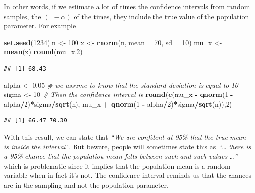 \documentclass[
]{article}
\newenvironment{Shaded}{\begin{snugshade}}{\end{snugshade}}
\newcommand{\AttributeTok}[1]{\textcolor[rgb]{0.13,0.29,0.53}{#1}}
\newcommand{\CommentTok}[1]{\textcolor[rgb]{0.56,0.35,0.01}{\textit{#1}}}
\newcommand{\DecValTok}[1]{\textcolor[rgb]{0.00,0.00,0.81}{#1}}
\newcommand{\FloatTok}[1]{\textcolor[rgb]{0.00,0.00,0.81}{#1}}
\newcommand{\FunctionTok}[1]{\textcolor[rgb]{0.13,0.29,0.53}{\textbf{#1}}}
\newcommand{\NormalTok}[1]{#1}
\newcommand{\OtherTok}[1]{\textcolor[rgb]{0.56,0.35,0.01}{#1}}
\newcommand{\SpecialCharTok}[1]{\textcolor[rgb]{0.81,0.36,0.00}{\textbf{#1}}}
\begin{document}
In other words, if we estimate a lot of times the confidence intervals
from random samples, the \((1- \alpha)%
\) of the times, they include the true value of the population
parameter. For example

\begin{Shaded}
\begin{Highlighting}[]
\FunctionTok{set.seed}\NormalTok{(}\DecValTok{1234}\NormalTok{)}
\NormalTok{n }\OtherTok{\textless{}{-}} \DecValTok{100}
\NormalTok{x }\OtherTok{\textless{}{-}} \FunctionTok{rnorm}\NormalTok{(n, }\AttributeTok{mean =} \DecValTok{70}\NormalTok{, }\AttributeTok{sd =} \DecValTok{10}\NormalTok{)}
\NormalTok{mu\_x }\OtherTok{\textless{}{-}} \FunctionTok{mean}\NormalTok{(x)}
\FunctionTok{round}\NormalTok{(mu\_x,}\DecValTok{2}\NormalTok{)}
\end{Highlighting}
\end{Shaded}

\begin{verbatim}
## [1] 68.43
\end{verbatim}

\begin{Shaded}
\begin{Highlighting}[]
\NormalTok{alpha }\OtherTok{\textless{}{-}} \FloatTok{0.05}
\CommentTok{\# we assume to know that the standard deviation is equal to 10}
\NormalTok{sigma }\OtherTok{\textless{}{-}} \DecValTok{10}
\CommentTok{\# Then the confidence interval is }
\FunctionTok{round}\NormalTok{(}\FunctionTok{c}\NormalTok{(mu\_x }\SpecialCharTok{{-}} \FunctionTok{qnorm}\NormalTok{(}\DecValTok{1} \SpecialCharTok{{-}}\NormalTok{ alpha}\SpecialCharTok{/}\DecValTok{2}\NormalTok{)}\SpecialCharTok{*}\NormalTok{sigma}\SpecialCharTok{/}\FunctionTok{sqrt}\NormalTok{(n), }
\NormalTok{  mu\_x }\SpecialCharTok{+} \FunctionTok{qnorm}\NormalTok{(}\DecValTok{1} \SpecialCharTok{{-}}\NormalTok{ alpha}\SpecialCharTok{/}\DecValTok{2}\NormalTok{)}\SpecialCharTok{*}\NormalTok{sigma}\SpecialCharTok{/}\FunctionTok{sqrt}\NormalTok{(n)),}\DecValTok{2}\NormalTok{)}
\end{Highlighting}
\end{Shaded}

\begin{verbatim}
## [1] 66.47 70.39
\end{verbatim}

With this result, we can state that \emph{``We are confident at 95\%
that the true mean is inside the interval''}. But beware, people will
sometimes state this as \emph{``\ldots{} there is a 95\% chance that the
population mean falls between such and such values \ldots{}''} which is
problematic since it implies that the population mean is a random
variable when in fact it's not. The confidence interval reminds us that
the chances are in the sampling and not the population parameter.
\end{document}
